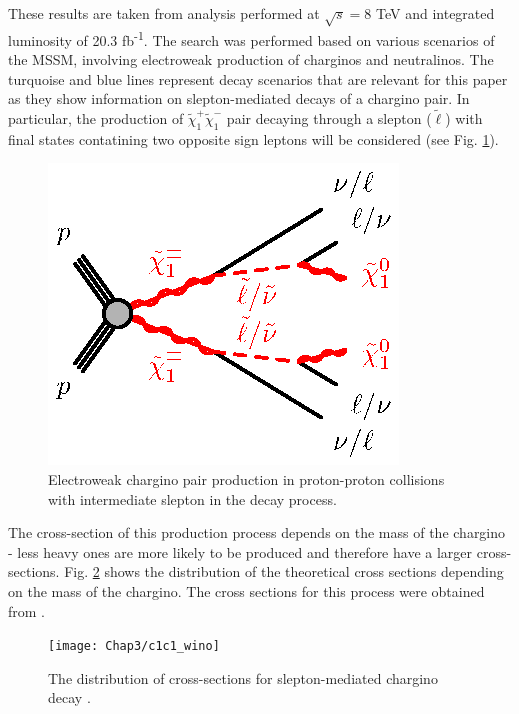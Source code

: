 These results are taken from \citep{atlas2015search} analysis performed at $\sqrt{s}=$8 TeV and integrated luminosity of 20.3 fb\textsuperscript{-1}. The search was performed based on various scenarios of the MSSM, involving electroweak production of charginos and neutralinos. The turquoise and blue lines represent decay scenarios that are relevant for this paper as they show information on slepton-mediated decays of a chargino pair. 
In particular, the production of $\tilde{\chi}^{+}_{1}\tilde{\chi}^{-}_{1}$ pair decaying through a slepton ($\tilde{\ell}$) with final states contatining two opposite sign leptons will be considered (see Fig. \ref{fig:EWchargino}). 
\begin{figure}[!h]
  \centering   	
  	\captionsetup{width=0.8\textwidth}
	\includegraphics[]{Chap2/C1C1-llvvN1N1-slsnu}	
\caption[Feynman diagram of slepton-mediated chargino decay]{Electroweak chargino pair production in proton-proton collisions with intermediate slepton in the decay process.}\label{fig:EWchargino}
\end{figure}  

The cross-section of this production process depends on the mass of the chargino - less heavy ones are more likely to be produced and therefore have a larger cross-sections. Fig. \ref{fig:xsec} shows the distribution of the theoretical cross sections depending on the mass of the chargino.
The cross sections for this process were obtained from \citep{Fuks:2012qx,Fuks:2013vua}.

\begin{figure}
\centering
 \captionsetup{width=0.8\textwidth}
	\texttt{[image: Chap3/c1c1\_wino]}
	\caption{The distribution of cross-sections for slepton-mediated chargino decay \citep{xsec}.}
	\label{fig:xsec}
\end{figure}

